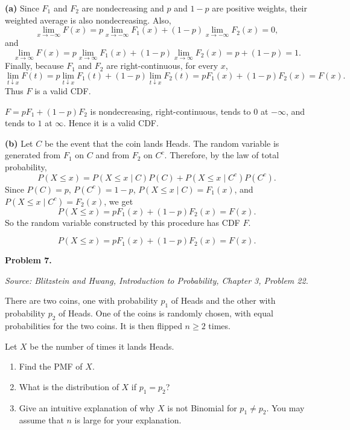 \documentclass[11pt]{article}
\newcommand{\source}[1]{%
    \vspace{0.15cm}
    {\small\textit{Source: Blitzstein and Hwang, \textit{Introduction to Probability}, Chapter 3, Problem #1.}}
}
\begin{document}
\begin{solutionbox}
\textbf{(a)} Since $F_1$ and $F_2$ are nondecreasing and $p$ and $1-p$ are positive weights, their weighted average is also nondecreasing. Also,
\[
\lim_{x\to -\infty}F(x)
=
p\lim_{x\to -\infty}F_1(x)+(1-p)\lim_{x\to -\infty}F_2(x)
=
0,
\]
and
\[
\lim_{x\to \infty}F(x)
=
p\lim_{x\to \infty}F_1(x)+(1-p)\lim_{x\to \infty}F_2(x)
=
p+(1-p)=1.
\]
Finally, because $F_1$ and $F_2$ are right-continuous, for every $x$,
\[
\lim_{t\downarrow x}F(t)
=
p\lim_{t\downarrow x}F_1(t)+(1-p)\lim_{t\downarrow x}F_2(t)
=
pF_1(x)+(1-p)F_2(x)
=
F(x).
\]
Thus $F$ is a valid CDF.

\begin{finalanswerbox}
$F=pF_1+(1-p)F_2$ is nondecreasing, right-continuous, tends to $0$ at $-\infty$, and tends to $1$ at $\infty$. Hence it is a valid CDF.
\end{finalanswerbox}

\textbf{(b)} Let $C$ be the event that the coin lands Heads. The random variable is generated from $F_1$ on $C$ and from $F_2$ on $C^c$. Therefore, by the law of total probability,
\[
P(X\le x)
=
P(X\le x\mid C)P(C)+P(X\le x\mid C^c)P(C^c).
\]
Since $P(C)=p$, $P(C^c)=1-p$, $P(X\le x\mid C)=F_1(x)$, and $P(X\le x\mid C^c)=F_2(x)$, we get
\[
P(X\le x)=pF_1(x)+(1-p)F_2(x)=F(x).
\]
So the random variable constructed by this procedure has CDF $F$.

\begin{finalanswerbox}
\[
P(X\le x)=pF_1(x)+(1-p)F_2(x)=F(x).
\]
\end{finalanswerbox}
\end{solutionbox}
\newpage


\begin{problemheader}
\textbf{Problem 7. }
\end{problemheader}
\source{22}

There are two coins, one with probability $p_1$ of Heads and the other with probability $p_2$ of Heads. One of the coins is randomly chosen, with equal probabilities for the two coins. It is then flipped $n\ge2$ times.

Let $X$ be the number of times it lands Heads.

\begin{enumerate}[label=(\alph*), leftmargin=*]
    \item Find the PMF of $X$.

    \item What is the distribution of $X$ if $p_1=p_2$?

    \item Give an intuitive explanation of why $X$ is not Binomial for $p_1\ne p_2$. You may assume that $n$ is large for your explanation.
\end{enumerate}
\end{document}
